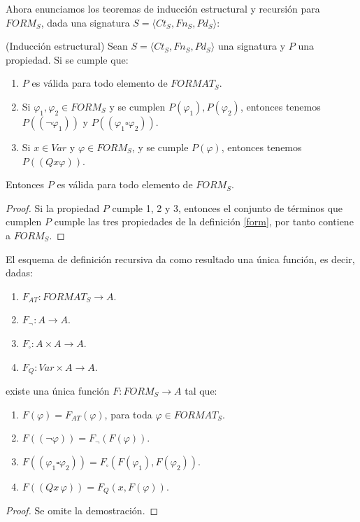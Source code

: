 Ahora enunciamos los teoremas de inducción estructural y recursión para $FORM_S$, dada una signatura $S = \langle Ct_{S}, Fn_{S}, Pd_{S}\rangle$:

\begin{prop}(Inducción estructural)
Sean $S = \langle Ct_{S}, Fn_{S}, Pd_{S}\rangle$ una signatura y $P$ una propiedad. Si se cumple que:
\begin{enumerate}
    \item $P$ es válida para todo elemento de $FORMAT_S$.
    \item Si $\varphi_1, \varphi_2 \in FORM_S$ y se cumplen $P(\varphi_1),P(\varphi_2)$, entonces tenemos $P((\neg \varphi_1))$ y  $P((\varphi_1 \square \varphi_2))$.
    \item Si $x \in Var$ y $\varphi \in FORM_S$, y se cumple $P(\varphi)$, entonces tenemos $P((Q x \varphi))$.
\end{enumerate}
Entonces $P$ es válida para todo elemento de $FORM_S$.
\end{prop}
\begin{proof}
Si la propiedad $P$ cumple 1, 2 y 3, entonces el conjunto de términos que cumplen $P$ cumple las tres propiedades de la definición \ref{form}, por tanto contiene a $FORM_S$.
\end{proof}

 \begin{prop} El esquema de definición recursiva da como resultado una única función, es decir, dadas:
\begin{enumerate}
    \item $F_{AT}: FORMAT_S \rightarrow A$.
    \item $F_{\neg}: A \rightarrow A$.
    \item $F_{\square}: A \times A \rightarrow A$.
    \item $F_Q:Var\times A\rightarrow A$.
\end{enumerate}
existe una única función $F: FORM_S \rightarrow A$ tal que:
\begin{enumerate}
    \item $F(\varphi) = F_{AT}(\varphi)$, para toda $\varphi \in FORMAT_S$.
    \item $F((\neg \varphi)) = F_{\neg}(F(\varphi))$.
    \item $F((\varphi_1 \square \varphi_2)) = F_{\square}(F(\varphi_1), F(\varphi_2))$.
    \item $F((Qx\,\varphi))=F_Q(x,F(\varphi))$.
\end{enumerate}
\begin{proof}
     Se omite la demostración.
\end{proof}
\end{prop}


